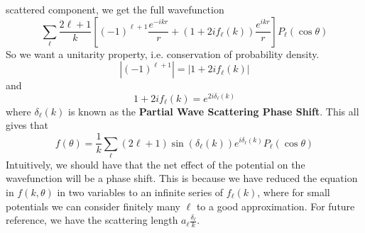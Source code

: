 \documentclass{article}
\theoremstyle{definition}
\begin{document}
scattered component, we get the full wavefunction \begin{equation} \sum_\ell\frac{2\ell+1}{k}\left[(-1)^{\ell+1}\frac{e^{-ikr}}{r}+\left(1+2if_\ell(k)\right)\frac{e^{ikr}}{r}\right]P_\ell(\cos\theta) \end{equation} So we want a unitarity property, i.e. conservation of probability density. \begin{equation} |(-1)^{\ell+1}|=|1+2if_\ell(k)| \end{equation} and \begin{equation} 1+2if_\ell(k)=e^{2i\delta_\ell(k)} \end{equation} where $\delta_\ell(k)$ is known as the \textbf{Partial Wave Scattering Phase Shift}. This all gives that \begin{equation} f(\theta)=\frac{1}{k}\sum_\ell(2\ell+1)\sin(\delta_\ell(k))e^{i\delta_\ell(k)}P_\ell(\cos\theta) \end{equation} Intuitively, we should have that the net effect of the potential on the wavefunction will be a phase shift. This is because we have reduced the equation in $f(k,\theta)$ in two variables to an infinite series of $f_\ell(k)$, where for small potentials we can consider finitely many $\ell$ to a good approximation. For future reference, we have the scattering length $a_\ell\frac{\delta_\ell}{k}$.
\end{document}
